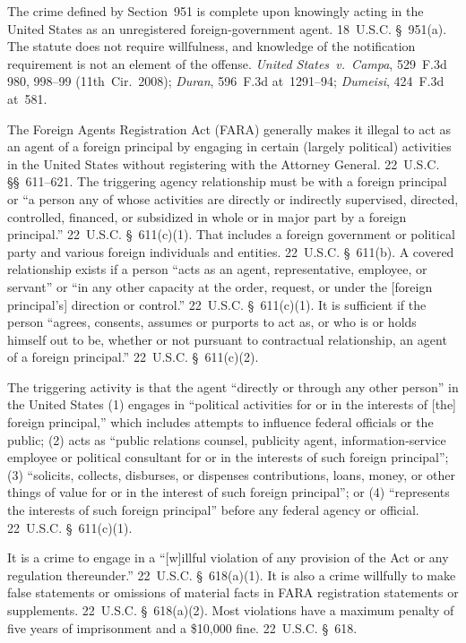 The crime defined by Section~951 is complete upon knowingly acting in the United States as an unregistered foreign-government agent.
18~U.S.C. \S~951(a).
The statute does not require willfulness, and knowledge of the notification requirement is not an element of the offense.
\textit{United States~v.\ Campa}, 529~F.3d 980, 998--99 (11th~Cir.~2008); \textit{Duran}, 596~F.3d at~1291--94; \textit{Dumeisi}, 424~F.3d at~581.

The Foreign Agents Registration Act (FARA) generally makes it illegal to act as an agent of a foreign principal by engaging in certain (largely political) activities in the United States without registering with the Attorney General. 22~U.S.C. \S\S~611--621. The triggering agency relationship must be with a foreign principal or ``a person any of whose activities are directly or indirectly supervised, directed, controlled, financed, or subsidized in whole or in major part by a foreign principal.'' 22~U.S.C. \S~611(c)(1).
That includes a foreign government or political party and various foreign individuals and entities.
22~U.S.C. \S~611(b).
A covered relationship exists if a person ``acts as an agent, representative, employee, or servant'' or ``in any other capacity at the order, request, or under the [foreign principal's] direction or control.''
22~U.S.C. \S~611(c)(1).
It is sufficient if the person ``agrees, consents, assumes or purports to act as, or who is or holds himself out to be, whether or not pursuant to contractual relationship, an agent of a foreign principal.''
22~U.S.C. \S~611(c)(2).

The triggering activity is that the agent ``directly or through any other person'' in the United States (1) engages in ``political activities for or in the interests of [the] foreign principal,'' which includes attempts to influence federal officials or the public; (2) acts as ``public relations counsel, publicity agent, information-service employee or political consultant for or in the interests of such foreign principal''; (3) ``solicits, collects, disburses, or dispenses contributions, loans, money, or other things of value for or in the interest of such foreign principal''; or (4) ``represents the interests of such foreign principal'' before any federal agency or official.
22~U.S.C. \S~611(c)(1).

It is a crime to engage in a ``[w]illful violation of any provision of the Act or any regulation thereunder.''
22~U.S.C. \S~618(a)(1).
It is also a crime willfully to make false statements or omissions of material facts in FARA registration statements or supplements.
22~U.S.C. \S~618(a)(2).
Most violations have a maximum penalty of five years of imprisonment and a \$10,000 fine.
22~U.S.C. \S~618.

